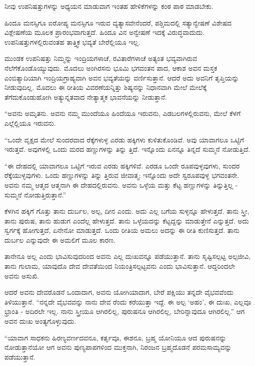 ನೀವು ಉಪನಿಷತ್ತುಗಳನ್ನು ಅಧ್ಯಯನ ಮಾಡುವಾಗ ಇಂತಹ ಹೇಳಿಕೆಗಳನ್ನು ಕಂಠ ಪಾಠ ಮಾಡಬೇಕು.

ಹಿಂದೂ ಮನಸ್ಸಿಗೂ ಐರೋಪ್ಯ ಮನಸ್ಸಿಗೂ ಇರುವ ವ್ಯತ್ಯಾಸವೇನೆಂದರೆ, ಪಶ್ಚಿಮದಲ್ಲಿ ಸತ್ಯಾನ್ವೇಷಣೆ ವಿಶೇಷದ ವಿಶ್ಲೇಷಣೆಯ ಮೂಲಕ ಪ್ರಾರಂಭವಾಗುತ್ತದೆ. ಹಿಂದೂ ವಿನ ಅನ್ವೇಷಣೆ ಇದಕ್ಕೆ ವಿರುದ್ಧವಾದುದು. ಉಪನಿಷತ್ತುಗಳಲ್ಲಿರುವಂತಹ ತಾತ್ತ್ವಿಕ ಭವ್ಯತೆ ಬೇರೆಲ್ಲಿಯೂ ಇಲ್ಲ.

ಮುಂಡಕ ಉಪನಿಷತ್ತು ನಿಮ್ಮನ್ನು ಇಂದ್ರಿಯಗಳಾಚೆ, ರವಿತಾರೆಗಳಾಚೆ ಅತ್ಯಂತ ಭವ್ಯವಾಗಿರುವ ನೆಲೆಗೆಕೊಂಡೊಯ್ಯುವುದು. ಮೊದಲು ಅಂಗಿರಸನು ಭೂಮಿ ಭಗವಂತನ ಪಾದ, ಆಕಾಶ ಅವನ ಮಸ್ತಕ ಎಂಬಿತ್ಯಾದಿಯಾಗಿ ಇಂದ್ರಿಯಗ್ರಾಹ್ಯವಾಗಿ ಅವನ ಭವ್ಯತೆಯನ್ನು ವರ್ಣಿಸುತ್ತಾನೆ. ಆದರೆ ಅದು ಅವನಿಗೆ ತೃಪ್ತಿಯನ್ನು ನೀಡುವುದಿಲ್ಲ. ಮೊದಲು ಈ ರೀತಿಯ ವಿವರಣೆಯನ್ನಿತ್ತು ಶಿಷ್ಯನನ್ನು ನಿಧಾನವಾಗಿ ಮೇಲೆ ಮೇಲೆಕ್ಕೆ ತೆಗೆದುಕೊಂಡುಹೋಗಿ ಅತ್ಯುನ್ನತವಾದ ನೇತ್ಯಾತ್ಮಕ ಭಾವನೆಯನ್ನು ನೀಡುತ್ತಾನೆ.

“ಅವನು ಅಮೃತನು. ಅವನು ನಮ್ಮ ಮುಂದೆಯೂ ಹಿಂದೆಯೂ ಇರುವನು, ಎಡಬಲಗಳಲ್ಲಿರುವನು, ಮೇಲೆ ಕೆಳಗೆ ಎಲ್ಲೆಲ್ಲಿಯೂ ಇರುವನು.

“ಒಂದೇ ವೃಕ್ಷದ ಮೇಲೆ ಸುಂದರವಾದ ರೆಕ್ಕೆಗಳುಳ್ಳ ಎರಡು ಹಕ್ಕಿಗಳು ಕುಳಿತುಕೊಂಡಿವೆ. ಅವು ಯಾವಾಗಲೂ ಒಟ್ಟಿಗೆ ಇರುತ್ತವೆ. ಅವುಗಳಲ್ಲಿ ಒಂದು ಮರದ ಹಣ್ಣುಗಳನ್ನು ತಿನ್ನು ತ್ತಿದೆ. ಇನ್ನೊಂದು ಏನನ್ನೂ ತಿನ್ನದೆ ಸುಮ್ಮನೆ ನೋಡುತ್ತಿದೆ.

“ಈ ದೇಹದಲ್ಲಿ ಯಾವಾಗಲೂ ಒಟ್ಟಿಗೆ ಇರುವ ಎರಡು ಹಕ್ಕಿಗಳಿವೆ. ಎರಡೂ ಒಂದೇ ರೂಪವುಳ್ಳವುಗಳು, ಸುಂದರ ರೆಕ್ಕೆಯುಳ್ಳವುಗಳು. ಒಂದು ಹಣ್ಣುಗಳನ್ನು ತಿನ್ನು ತ್ತಿರುವ ಜೀವಾತ್ಮ; ಇನ್ನೊಂದು ಅದೇ ಸ್ವರೂಪವುಳ್ಳ ಭಗವಂತನೇ. ಅವನು ನಮ್ಮ ಆತ್ಮದ ಆತ್ಮನಾಗಿ ಈ ದೇಹದಲ್ಲಿರುವನು. ಅವನು ಒಳ್ಳೆಯ ಮತ್ತು ಕೆಟ್ಟ ಹಣ್ಣುಗಳನ್ನು ತಿನ್ನುತ್ತಿಲ್ಲ - ಸುಮ್ಮನೆ ನೋಡುತ್ತಿರುತ್ತಾನೆ.”

ಕೆಳಗಿನ ಹಕ್ಕಿಗೆ ಗೊತ್ತು ತಾನು ದುರ್ಬಲ, ಅಲ್ಪ, ದೀನ ಎಂದು. ಅದು ಎಲ್ಲ ಬಗೆಯ ಸುಳ್ಳನ್ನೂ ಹೇಳುತ್ತದೆ. ತಾನು ಸ್ತ್ರೀ, ತಾನು ಪುರುಷ, ತಾನು ಹುಡುಗ ಎಂದೆಲ್ಲ ಹೇಳುತ್ತದೆ. ತಾನು ಒಳ್ಳೆಯದನ್ನು ಕೆಟ್ಟದ್ದನ್ನು ಮಾಡುತ್ತೇನೆ ಎನ್ನುತ್ತದೆ. ಅದು ಸ್ವರ್ಗಕ್ಕೆ ಹೋಗುತ್ತದೆ, ಏನೇನೋ ಮಾಡುತ್ತದೆ. ಒಂದು ರೀತಿಯ ಅಮಲು ಅದನ್ನು ಈ ರೀತಿ ಕುಣಿಸುತ್ತದೆ. ತಾನು ದುರ್ಬಲ ಎನ್ನುವುದೇ ಈ ಅಮಲಿಗೆ ಮೂಲ ಕಾರಣ.

ತಾನೇನೂ ಅಲ್ಲ ಎಂದು ಭಾವಿಸುವುದರಿಂದ ಅವನು ಎಲ್ಲ ದುಃಖವನ್ನೂ ಪಡೆಯುತ್ತಾನೆ. ತಾನು ಸೃಷ್ಟಿಸಲ್ಪಟ್ಟ ಅಲ್ಪಜೀವಿ, ತಾನು ಗುಲಾಮ, ಯಾವುದೊ ದೇವ ದೇವತೆಯಿಂದ ನಿಯಂತ್ರಿಸಲ್ಪಟ್ಟವನು ಎಂದು ಭಾವಿಸುತ್ತಾನೆ. ಆದ್ದರಿಂದಲೇ ಅವನು ಅಸುಖಿ.

ಆದರೆ ಅವನು ದೇವರೊಡನೆ ಒಂದಾದಾಗ, ಅವನು ಯೋಗಿಯಾದಾಗ, ಬೇರೆ ಪಕ್ಷಿಯು ತನ್ನದೇ ವೈಭವವೆಂದು ತಿಳಿಯುತ್ತಾನೆ. “ನನ್ನದೇ ವೈಭವವನ್ನು ನಾನು ದೇವ ರೆಂದು ಕರೆಯುತ್ತಾ ಇದ್ದೆ. ಈ ಅಲ್ಪ ‘ಅಹಂ’, ಈ ದುಃಖ, ಎಲ್ಲವೂ ಭ್ರಾಂತಿ - ಅದಿರಲೇ ಇಲ್ಲ. ನಾನು ಸ್ತ್ರೀಯೂ ಆಗಿರಲಿಲ್ಲ, ಪುರುಷನೂ ಆಗಿರಲಿಲ್ಲ, ಬೇರಿನ್ನಾವುದೂ ಆಗಿರಲಿಲ್ಲ.” ಆಗ ಅವನ ದುಃಖ ಅಂತ್ಯಗೊಳ್ಳುವುದು.

“ಯಾವಾಗ ಸಾಧಕನು ಹಿರಣ್ಯವರ್ಣದವನೂ, ಕರ್ತೃವೂ, ಈಶನೂ, ಬ್ರಹ್ಮ ಯೋನಿಯೂ ಆದ ಪುರುಷನನ್ನು ನೋಡುತ್ತಾನೆಯೋ ಆಗ ಅವನು ಪುಣ್ಯಪಾಪಗಳಿಂದ ಮುಕ್ತನಾಗಿ, ನಿರಂಜನ ಬ್ರಹ್ಮದೊಡನೆ ಪರಮಸಾಮ್ಯವನ್ನು ಪಡೆಯುತ್ತಾನೆ.

